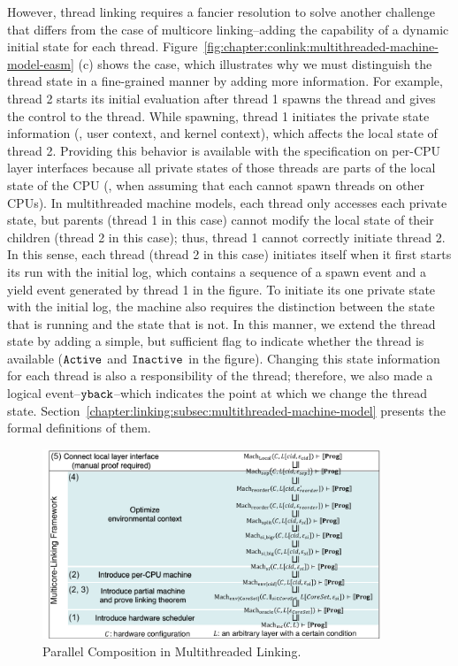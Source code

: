 However, thread linking requires a fancier resolution to solve another challenge that differs from the case of multicore linking--adding the capability of a dynamic initial state for each thread. 
Figure~\ref{fig:chapter:conlink:multithreaded-machine-model-easm} (c) 
shows the case, which illustrates why we must distinguish the thread state in a fine-grained manner by adding more information. 
For example, thread 2 starts its initial evaluation after thread 1 spawns the thread and gives the control to the thread. While spawning, thread 1 initiates the private state information (\eg, user context, and kernel context), which affects the local state of thread 2. 
Providing this behavior is available with the specification on per-CPU layer interfaces because all private states of those threads are parts of the local state of the CPU (\ie, when assuming that each cannot spawn threads on other CPUs). 
In multithreaded machine models, each thread only accesses each private state, but parents (thread 1 in this case) cannot modify the local state of their children (thread 2 in this case); thus, thread 1 cannot correctly initiate thread 2. 
In this sense, each thread (thread 2 in this case) initiates itself when it first starts its run with the initial log, which contains a sequence of a spawn event and a yield event generated by thread 1 in the figure. 
To initiate its one private state with the initial log, the machine also requires the distinction between the state that is running and the state that is not. 
In this manner, we extend the thread state by adding a simple, but sufficient flag to indicate whether the thread is available (${\mathrm{\texttt{Active}}}$ and ${\mathrm{\texttt{Inactive}}}$ in the figure). 
Changing this state information for each thread is also a responsibility of the thread; therefore, we also made a logical event--${\mathrm{\texttt{yback}}}$--which indicates the point at which we change the thread state. Section~\ref{chapter:linking:subsec:multithreaded-machine-model} presents the formal definitions of them.

\begin{figure}
\begin{center}
\includegraphics[width=0.9\textwidth, page=6]{figs/conlink/concurrent_linking}
\end{center}
\caption{Parallel Composition in Multithreaded Linking.}
\label{fig:chapter:conlink:parallel-composition-in-easm}
\end{figure}


